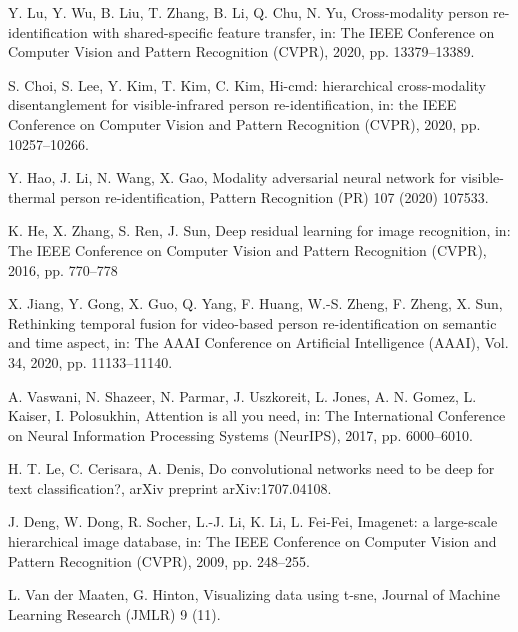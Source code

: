 \documentclass[review]{elsarticle}
\begin{document}
\begin{thebibliography}{1}
Y. Lu, Y. Wu, B. Liu, T. Zhang, B. Li, Q. Chu, N. Yu, Cross-modality person re-identification with shared-specific feature transfer, in: The IEEE Conference on Computer Vision and Pattern Recognition (CVPR), 2020, pp. 13379–13389.

S. Choi, S. Lee, Y. Kim, T. Kim, C. Kim, Hi-cmd: hierarchical cross-modality disentanglement for visible-infrared person re-identification, in: the IEEE Conference on Computer Vision and Pattern Recognition (CVPR), 2020, pp. 10257–10266.

Y. Hao, J. Li, N. Wang, X. Gao, Modality adversarial neural network for visible-thermal person re-identification, Pattern Recognition (PR) 107 (2020) 107533.

K. He, X. Zhang, S. Ren, J. Sun, Deep residual learning for image recognition, in: The IEEE Conference on Computer Vision and Pattern Recognition (CVPR), 2016, pp. 770–778

X. Jiang, Y. Gong, X. Guo, Q. Yang, F. Huang, W.-S. Zheng, F. Zheng, X. Sun, Rethinking temporal fusion for video-based person re-identification on semantic and time aspect, in: The AAAI Conference on Artificial Intelligence (AAAI), Vol. 34, 2020, pp. 11133–11140.

A. Vaswani, N. Shazeer, N. Parmar, J. Uszkoreit, L. Jones, A. N. Gomez, L. Kaiser, I. Polosukhin, Attention is all you need, in: The International Conference on Neural Information Processing Systems (NeurIPS), 2017, pp. 6000–6010.

H. T. Le, C. Cerisara, A. Denis, Do convolutional networks need to be deep for text classification?, arXiv preprint arXiv:1707.04108.

J. Deng, W. Dong, R. Socher, L.-J. Li, K. Li, L. Fei-Fei, Imagenet: a large-scale hierarchical image database, in: The IEEE Conference on Computer Vision and Pattern Recognition (CVPR), 2009, pp. 248–255.

L. Van der Maaten, G. Hinton, Visualizing data using t-sne, Journal of Machine Learning Research (JMLR) 9 (11).


\end{thebibliography}
\end{document}
